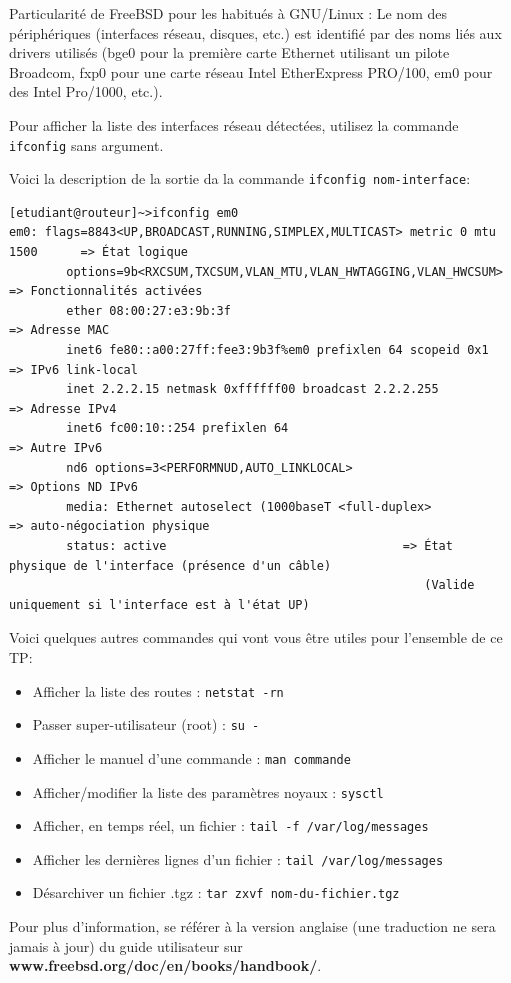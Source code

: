 \documentclass[a4paper,11pt]{article}
\newcommand{\shellcmd}[1]{\texttt{#1}}
\begin{document}
Particularité de FreeBSD pour les habitués à GNU/Linux : Le nom des périphériques (interfaces réseau, disques, etc.) est identifié par des noms liés aux drivers utilisés (bge0 pour la première carte Ethernet utilisant un pilote Broadcom, fxp0 pour une carte réseau Intel EtherExpress PRO/100, em0 pour des Intel Pro/1000, etc.).

Pour afficher la liste des interfaces réseau détectées, utilisez la commande \shellcmd{ifconfig} sans argument.

Voici la description de la sortie da la commande \shellcmd{ifconfig nom-interface}:
\footnotesize
\begin{verbatim}
[etudiant@routeur]~>ifconfig em0
em0: flags=8843<UP,BROADCAST,RUNNING,SIMPLEX,MULTICAST> metric 0 mtu 1500      => État logique
        options=9b<RXCSUM,TXCSUM,VLAN_MTU,VLAN_HWTAGGING,VLAN_HWCSUM>          => Fonctionnalités activées
        ether 08:00:27:e3:9b:3f                                                => Adresse MAC
        inet6 fe80::a00:27ff:fee3:9b3f%em0 prefixlen 64 scopeid 0x1            => IPv6 link-local
        inet 2.2.2.15 netmask 0xffffff00 broadcast 2.2.2.255                 => Adresse IPv4
        inet6 fc00:10::254 prefixlen 64                                        => Autre IPv6
        nd6 options=3<PERFORMNUD,AUTO_LINKLOCAL>                               => Options ND IPv6
        media: Ethernet autoselect (1000baseT <full-duplex>                    => auto-négociation physique
        status: active                                 => État physique de l'interface (présence d'un câble)
                                                          (Valide uniquement si l'interface est à l'état UP)
\end{verbatim}
\normalsize
Voici quelques autres commandes qui vont vous être utiles pour l'ensemble de ce TP:
\begin{itemize}
\item Afficher la liste des routes : \shellcmd{netstat -rn}
\item Passer super-utilisateur (root) : \shellcmd{su -}
\item Afficher le manuel d'une commande : \shellcmd{man commande}
\item Afficher/modifier la liste des paramètres noyaux : \shellcmd{sysctl}
\item Afficher, en temps réel, un fichier : \shellcmd{tail -f /var/log/messages}
\item Afficher les dernières lignes d'un fichier : \shellcmd{tail /var/log/messages}
\item Désarchiver un fichier .tgz : \shellcmd{tar zxvf nom-du-fichier.tgz}
\end{itemize}
Pour plus d'information, se référer à la version anglaise (une traduction ne sera jamais à jour) du guide utilisateur sur \textbf{www.freebsd.org/doc/en/books/handbook/}.
\end{document}
